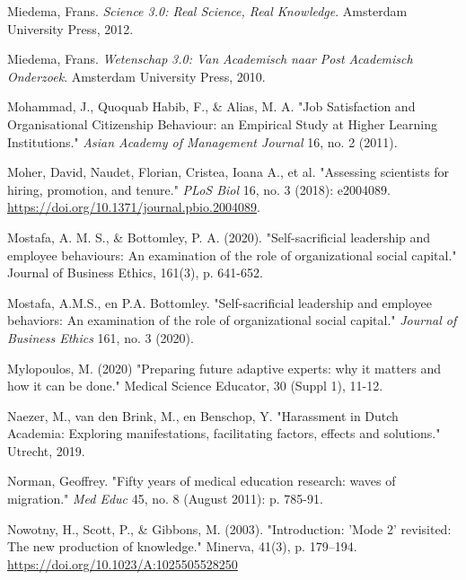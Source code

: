 \documentclass[smallauthor, chapterhaspagenum, nochapterinheader, pagenuminheader,  bigchapnum,medium2, tocpages,  garamond, titleinheader]{jote-book}
\begin{document}
\begin{references}
		Miedema, Frans. \emph{Science 3.0: Real Science, Real Knowledge}. Amsterdam University Press, 2012.



		Miedema, Frans. \emph{Wetenschap}\emph{ 3.0: Van }\emph{Academisch}\emph{ }\emph{naar}\emph{ Post }\emph{Academisch}\emph{ }\emph{Onderzoek}. Amsterdam University Press, 2010.



		Mohammad, J., Quoquab Habib, F., \& Alias, M. A. "Job Satisfaction and Organisational Citizenship Behaviour: an Empirical Study at Higher Learning Institutions." \emph{Asian Academy of Management Journal} 16, no. 2 (2011).



		Moher, David, Naudet, Florian, Cristea, Ioana A., et al. "Assessing scientists for hiring, promotion, and tenure." \emph{PLoS Biol} 16, no. 3 (2018): e2004089. \href{https://doi.org/10.1371/journal.pbio.2004089}{https://doi.org/10.1371/journal.pbio.2004089}.



		Mostafa, A. M. S., \& Bottomley, P. A. (2020). "Self-sacrificial leadership and employee behaviours: An examination of the role of organizational social capital." Journal of Business Ethics, 161(3), p. 641-652.



		Mostafa, A.M.S., en P.A. Bottomley. "Self-sacrificial leadership and employee behaviors: An examination of the role of organizational social capital." \emph{Journal of Business Ethics} 161, no. 3 (2020).



		Mylopoulos, M. (2020) "Preparing future adaptive experts: why it matters and how it can be done." Medical Science Educator, 30 (Suppl 1), 11-12.



		Naezer, M., van den Brink, M., en Benschop, Y. "Harassment in Dutch Academia: Exploring manifestations, facilitating factors, effects and solutions." Utrecht, 2019.



		Norman, Geoffrey. "Fifty years of medical education research: waves of migration." \emph{Med Educ} 45, no. 8 (August 2011): p. 785-91.



		Nowotny, H., Scott, P., \& Gibbons, M. (2003). "Introduction: 'Mode 2' revisited: The new production of knowledge." Minerva, 41(3), p. 179--194. \href{https://doi.org/10.1023/A:1025505528250}{https://doi.org/10.1023/A:1025505528250}




\end{references}
\end{document}
